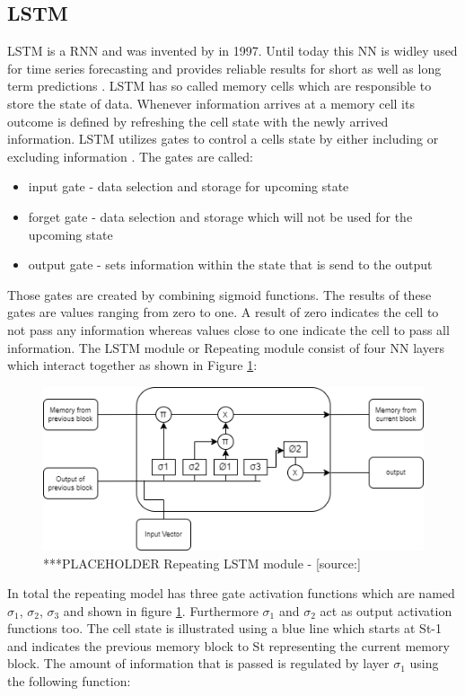 \subsection{LSTM}
\label{sec:lstm}
LSTM is a RNN and was invented by \cite{lstm_inventor} in 1997. Until today this NN is widley used for time series forecasting and provides reliable results for short as well as long term predictions \cite{rnn_moharm}. LSTM has so called memory cells which are responsible to store the state of data. Whenever information arrives at a memory cell its outcome is defined by refreshing the cell state with the newly arrived information. LSTM utilizes gates to control a cells state by either including or excluding information \cite{lstm_stock}. The gates are called: 
\begin{itemize}
\item input gate - data selection and storage for upcoming state
\item forget gate - data selection and storage which will not be used for the upcoming state
\item output gate - sets information within the state that is send to the output
\end{itemize}
Those gates are created by combining sigmoid functions. The results of these gates are values ranging from zero to one. A result of zero indicates the cell to not pass any information whereas values close to one indicate the cell to pass all information. 
The LSTM module or Repeating module consist of four NN layers which interact together as shown in Figure \ref{fig:lstm_rep_model}:
\begin{figure}[H]
	\centering
		\includegraphics[width=14cm]{images/lstm_module}
	\caption{***PLACEHOLDER Repeating LSTM module - [source:\cite{lstm_module}]}
	\label{fig:lstm_rep_model}
\end{figure}
In total the repeating model has three gate activation functions which are named $\sigma_1$, $\sigma_2$,  $\sigma_3$ and shown in figure \ref{fig:lstm_rep_model}. Furthermore $\sigma_1$ and $\sigma_2$ act as output activation functions too. The cell state is illustrated using a blue line which starts at St-1 and indicates the previous memory block to St representing the current memory block. The amount of information that is passed is regulated by layer  $\sigma_1$ using the following function:
